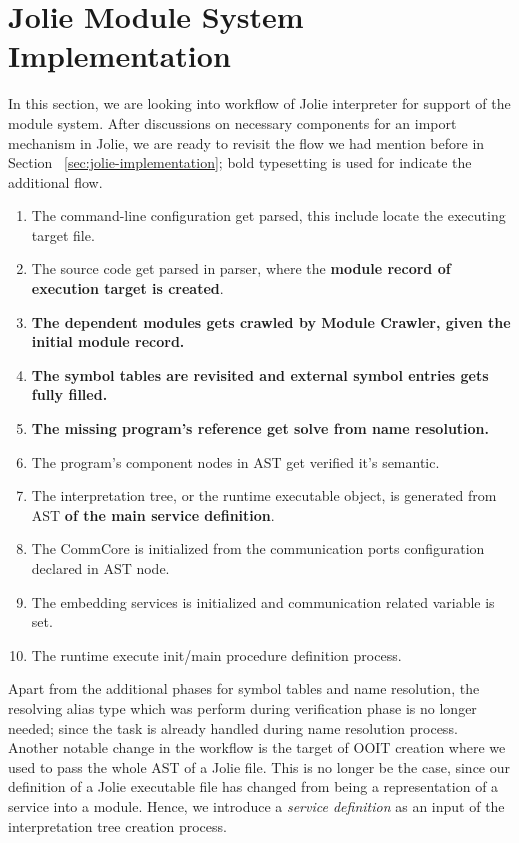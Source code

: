 
\section{Jolie Module System Implementation}

In this section, we are looking into workflow of Jolie interpreter for support of the module system. After discussions on necessary components for an import mechanism in Jolie, we are ready to revisit the flow we had mention before in Section ~\ref{sec:jolie-implementation}; bold typesetting is used for indicate the additional flow.

\begin{enumerate}
    \item The command-line configuration get parsed, this include locate the executing target file.
    \item The source code get parsed in parser, where the \textbf{module record of execution target is created}.
    \item \textbf{The dependent modules gets crawled by Module Crawler, given the initial module record.}
    \item \textbf{The symbol tables are revisited and external symbol entries gets fully filled.}
    \item \textbf{The missing program's reference get solve from name resolution.}
    \item The program's component nodes in AST get verified it's semantic.
    \item The interpretation tree, or the runtime executable object, is generated from AST \textbf{of the main service definition}.
    \item The CommCore is initialized from the communication ports configuration declared in AST node.
    \item The embedding services is initialized and communication related variable is set.
    \item The runtime execute init/main procedure definition process.
\end{enumerate}

Apart from the additional phases for symbol tables and name resolution, the resolving alias type which was perform during  verification phase is no longer needed; since the task is already handled during name resolution process.
Another notable change in the workflow is the target of OOIT creation where we used to pass the whole AST of a Jolie file.
This is no longer be the case, since our definition of a Jolie executable file has changed from being a representation of a service into a module.
Hence, we introduce a \textit{service definition} as an input of the interpretation tree creation process.